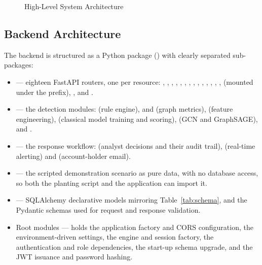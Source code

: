 \begin{figure}[htbp]
\centering
{}
\caption{High-Level System Architecture}
\label{fig:architecture}
\end{figure}

\subsection{Backend Architecture}
The backend is structured as a Python package () with clearly separated sub-packages:

\begin{itemize}
  \item {} --- eighteen FastAPI routers, one per resource: , , , , , , , , , , , , , ,  (mounted under the  prefix), ,  and .
  \item {} --- the detection modules:  (rule engine),  and  (graph metrics),  (feature engineering),  (classical model training and scoring),  (GCN and GraphSAGE),  and .
  \item {} --- the response workflow:  (analyst decisions and their audit trail),  (real-time alerting) and  (account-holder email).
  \item {} --- the scripted demonstration scenario as pure data, with no database access, so both the planting script and the application can import it.
  \item {} --- SQLAlchemy declarative models mirroring Table~\ref{tab:schema}, and the Pydantic schemas used for request and response validation.
  \item Root modules ---  holds the application factory and CORS configuration,  the environment-driven settings,  the engine and session factory,  the authentication and role dependencies,  the start-up schema upgrade, and  the JWT issuance and password hashing.
\end{itemize}

